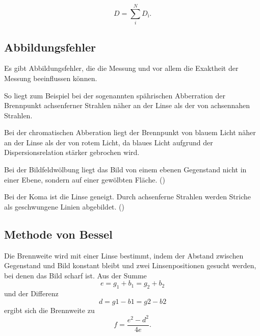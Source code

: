 \begin{equation*}
    D = \sum_{i}^N D_\text{i}.
    \label{eqn:brechungskraft}
\end{equation*}


\subsection{Abbildungsfehler}
Es gibt Abbildungsfehler, die die Messung und vor allem die Exaktheit der Messung beeinflussen können. 

\noindent So liegt zum Beispiel bei der sogenannten spährischen Abberration der Brennpunkt achsenferner Strahlen näher an der Linse als der von achsennahen Strahlen. 

\noindent Bei der chromatischen Abberation liegt der Brennpunkt von blauem Licht näher an der Linse als der von rotem Licht, da blaues Licht aufgrund der Dispersionsrelation stärker gebrochen wird.  

\noindent Bei der Bildfeldwölbung liegt das Bild von einem ebenen Gegenstand nicht in einer Ebene, sondern auf einer gewölbten Fläche. (\cite{fehler})

\noindent Bei der Koma ist die Linse geneigt. Durch achsenferne Strahlen werden Striche als geschwungene Linien abgebildet. (\cite{fehler})


\subsection{Methode von Bessel}
Die Brennweite wird mit einer Linse bestimmt, indem der Abstand zwischen Gegenstand und Bild konstant bleibt und zwei Linsenpositionen gesucht werden, bei denen das Bild scharf ist. Aus der Summe 
\begin{equation}
    e = g_1 + b_1 = g_2 + b_2
    \label{eqn:e}
\end{equation}
und der Differenz 
\begin{equation}
    d = g1- b1 = g2 - b2
    \label{eqn:d}
\end{equation}
ergibt sich die Brennweite zu
\begin{equation}
    f = \frac{e^2 - d^2}{4 e}.
    \label{eqn:fbessel}
\end{equation} 

